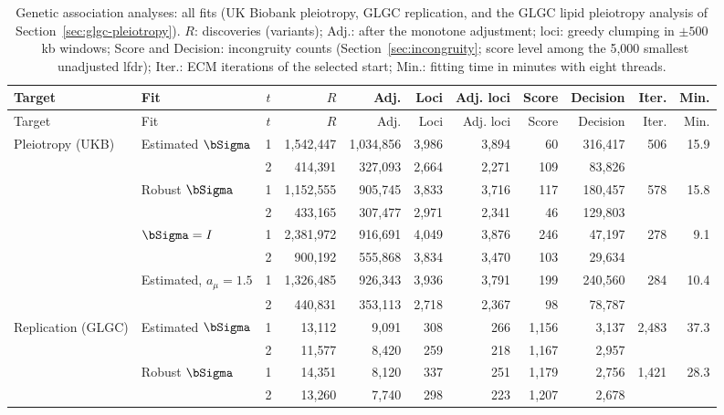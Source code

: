 {\footnotesize\setlength{\tabcolsep}{3.5pt}
\begin{longtable}{ll c rrrr rrr r}
\caption{Genetic association analyses: all fits (UK Biobank pleiotropy, GLGC replication, and the GLGC lipid pleiotropy analysis of Section~\ref{sec:glgc-pleiotropy}). $R$: discoveries (variants); Adj.: after the monotone adjustment; loci: greedy clumping in $\pm500$~kb windows; Score and Decision: incongruity counts (Section~\ref{sec:incongruity}; score level among the 5{,}000 smallest unadjusted lfdr); Iter.: ECM iterations of the selected start; Min.: fitting time in minutes with eight threads.}\label{tab:realdata-all}\\
\toprule
Target & Fit & $t$ & $R$ & Adj. & Loci & Adj. loci & Score & Decision & Iter. & Min.\\
\midrule
\endfirsthead
\toprule
Target & Fit & $t$ & $R$ & Adj. & Loci & Adj. loci & Score & Decision & Iter. & Min.\\
\midrule
\endhead
\bottomrule
\endfoot
Pleiotropy (UKB) & Estimated $\bSigma$ & 1 & 1{,}542{,}447 & 1{,}034{,}856 & 3{,}986 & 3{,}894 & 60 & 316{,}417 & 506 & 15.9\\
 &  & 2 & 414{,}391 & 327{,}093 & 2{,}664 & 2{,}271 & 109 & 83{,}826 &  & \\
 & Robust $\bSigma$ & 1 & 1{,}152{,}555 & 905{,}745 & 3{,}833 & 3{,}716 & 117 & 180{,}457 & 578 & 15.8\\
 &  & 2 & 433{,}165 & 307{,}477 & 2{,}971 & 2{,}341 & 46 & 129{,}803 &  & \\
 & $\bSigma=I$ & 1 & 2{,}381{,}972 & 916{,}691 & 4{,}049 & 3{,}876 & 246 & 47{,}197 & 278 & 9.1\\
 &  & 2 & 900{,}192 & 555{,}868 & 3{,}834 & 3{,}470 & 103 & 29{,}634 &  & \\
 & Estimated, $a_\mu=1.5$ & 1 & 1{,}326{,}485 & 926{,}343 & 3{,}936 & 3{,}791 & 199 & 240{,}560 & 284 & 10.4\\
 &  & 2 & 440{,}831 & 353{,}113 & 2{,}718 & 2{,}367 & 98 & 78{,}787 &  & \\
\midrule
Replication (GLGC) & Estimated $\bSigma$ & 1 & 13{,}112 & 9{,}091 & 308 & 266 & 1{,}156 & 3{,}137 & 2{,}483 & 37.3\\
 &  & 2 & 11{,}577 & 8{,}420 & 259 & 218 & 1{,}167 & 2{,}957 &  & \\
 & Robust $\bSigma$ & 1 & 14{,}351 & 8{,}120 & 337 & 251 & 1{,}179 & 2{,}756 & 1{,}421 & 28.3\\
 &  & 2 & 13{,}260 & 7{,}740 & 298 & 223 & 1{,}207 & 2{,}678 &  & \\

\end{longtable}}
